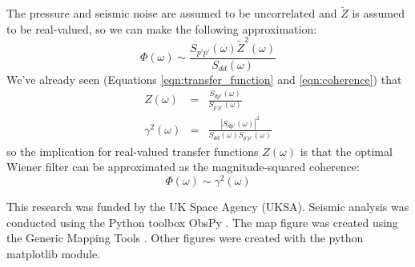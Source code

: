 \noindent The pressure and seismic noise are assumed to be uncorrelated and $\widetilde{Z}$ is assumed to be real-valued, so we can make the following approximation:
\begin{equation}
  \Phi (\omega) \sim \frac{ S_{p'p'} (\omega) \widetilde{Z}^2 (\omega)}{S_{dd} (\omega)}
  \label{eqn:approx_filter}
\end{equation}
\noindent We've already seen (Equations \ref{eqn:transfer_function} and \ref{eqn:coherence}) that
\begin{eqnarray}
  Z(\omega) &=& \frac{S_{dp'} (\omega)}{S_{p'p'} (\omega)} \\
  \gamma^2 (\omega) &=& \frac{ \left| S_{dp'} (\omega) \right|^2}{S_{dd} (\omega)S_{p'p'} (\omega)}
\end{eqnarray}
\noindent so the implication for real-valued transfer functions $Z (\omega)$ is that the optimal Wiener filter can be approximated as the magnitude-squared coherence:
\begin{equation}
  \Phi (\omega) \sim \gamma^2 (\omega)
  \label{eqn:optimal_filter}
\end{equation}



\begin{acknowledgements}
  This research was funded by the UK Space Agency (UKSA). 
  Seismic analysis was conducted using the Python toolbox ObsPy \citep{Beyreuther2010}.
  The map figure was created using the Generic Mapping Tools \citep{Wessel2013}. Other figures were created with the python matplotlib module.
\end{acknowledgements}









\grid
